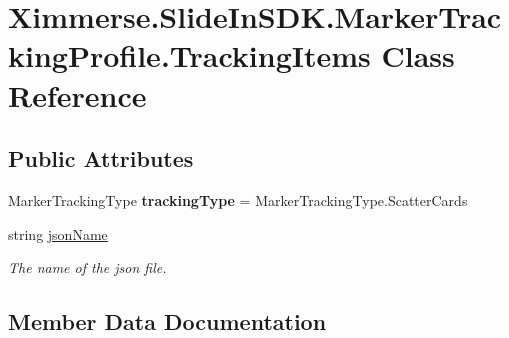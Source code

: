 \hypertarget{class_ximmerse_1_1_slide_in_s_d_k_1_1_marker_tracking_profile_1_1_tracking_items}{}\section{Ximmerse.\+Slide\+In\+S\+D\+K.\+Marker\+Tracking\+Profile.\+Tracking\+Items Class Reference}
\label{class_ximmerse_1_1_slide_in_s_d_k_1_1_marker_tracking_profile_1_1_tracking_items}
\subsection*{Public Attributes}
\begin{DoxyCompactItemize}
\item 
\mbox{\label{class_ximmerse_1_1_slide_in_s_d_k_1_1_marker_tracking_profile_1_1_tracking_items_a69754572e4049f6cc9be64593cfc6e4d}} 
Marker\+Tracking\+Type {\bfseries tracking\+Type} = Marker\+Tracking\+Type.\+Scatter\+Cards
\item 
string \mbox{\hyperlink{class_ximmerse_1_1_slide_in_s_d_k_1_1_marker_tracking_profile_1_1_tracking_items_ad2748aa795bf3d0725db4774601006a0}{json\+Name}}
\begin{DoxyCompactList}\small\item\em The name of the json file. \end{DoxyCompactList}\end{DoxyCompactItemize}


\subsection{Member Data Documentation}
\mbox{\label{class_ximmerse_1_1_slide_in_s_d_k_1_1_marker_tracking_profile_1_1_tracking_items_ad2748aa795bf3d0725db4774601006a0}} 
